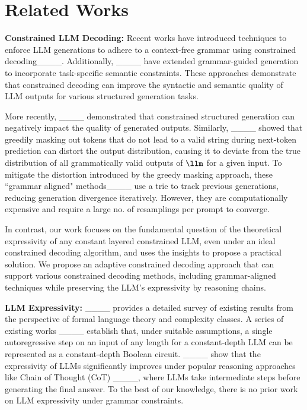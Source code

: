 \section{Related Works}
\textbf{Constrained LLM Decoding:}
Recent works have introduced techniques to enforce LLM generations to adhere to a context-free grammar using constrained decoding____.
Additionally, ____ have extended grammar-guided generation to incorporate task-specific semantic constraints. 
These approaches demonstrate that constrained decoding can improve the syntactic and semantic quality of LLM outputs for various structured generation tasks.

More recently, ____ demonstrated that constrained structured generation can negatively impact the quality of generated outputs. Similarly, ____ showed that greedily masking out tokens that do not lead to a valid string during next-token prediction can distort the output distribution, causing it to deviate from the true distribution of all grammatically valid outputs of $\llm$ for a given input.
To mitigate the distortion introduced by the greedy masking approach, these ``grammar aligned" methods____ use a trie to track previous generations, reducing generation divergence iteratively. 
However, they are computationally expensive and require a large no. of resamplings per prompt to converge.

In contrast, our work focuses on the fundamental question of the theoretical expressivity of any constant layered constrained LLM, even under an ideal constrained decoding algorithm, and uses the insights to propose a practical solution.
We propose an adaptive constrained decoding approach that can support various constrained decoding methods, including grammar-aligned techniques while preserving the LLM's expressivity by reasoning chains.

\textbf{LLM Expressivity:} ____ provides a detailed survey of existing results from the perspective of formal language theory and complexity classes. A series of existing works ____ establish that, under suitable assumptions, a single autoregressive step on an input of any length for a constant-depth LLM can be represented as a constant-depth Boolean circuit. ____ show that the expressivity of LLMs significantly improves under popular reasoning approaches like Chain of Thought (CoT) ____, where LLMs take intermediate steps before generating the final answer. To the best of our knowledge, there is no prior work on LLM expressivity under grammar constraints.